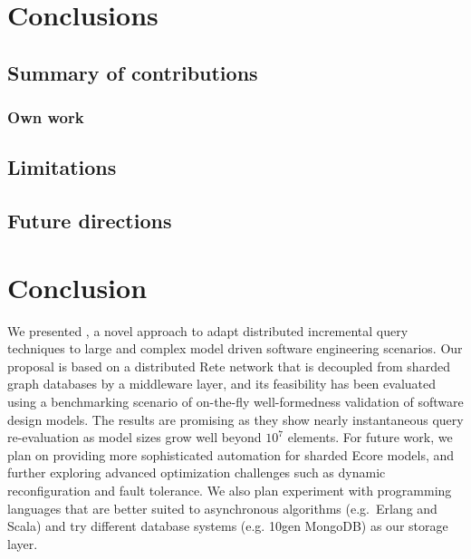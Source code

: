 \chapter{Conclusions}
\label{chap:conclusions}

\section{Summary of contributions}

\subsection{Own work}

\section{Limitations}

\section{Future directions}




\chapter{Conclusion}
\label{sec:conclusion}

We presented \iqd{}, a novel approach to adapt distributed incremental query techniques to large and complex model driven software engineering scenarios. Our proposal is based on a distributed Rete network that is decoupled from sharded graph databases by a middleware layer, and its feasibility has been evaluated using a benchmarking scenario of on-the-fly well-formedness validation of software design models. The results are promising as they show nearly instantaneous query re-evaluation as model sizes grow well beyond $10^7$ elements.
For future work, we plan on providing more sophisticated automation for sharded Ecore models, and further exploring advanced optimization challenges such as dynamic reconfiguration and fault tolerance.
We also plan experiment with programming languages that are better suited to asynchronous algorithms (e.g.\ Erlang and Scala) and try different database systems (e.g. 10gen MongoDB) as our storage layer.
